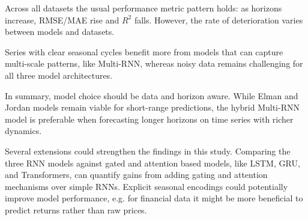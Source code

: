 \documentclass[conference]{IEEEtran}
\begin{document}
Across all datasets the usual performance metric pattern holds: as horizons increase, RMSE/MAE rise and $R^2$ falls. However, the rate of deterioration varies between models and datasets.

Series with clear seasonal cycles benefit more from models that can capture multi-scale patterns, like Multi-RNN, whereas noisy data remains challenging for all three model architectures.

In summary, model choice should be data and horizon aware. While Elman and Jordan models remain viable for short-range predictions, the hybrid Multi-RNN model is preferable when forecasting longer horizons on time series with richer dynamics.

Several extensions could strengthen the findings in this study. Comparing the three RNN models against gated and attention based models, like LSTM, GRU, and Transformers, can quantify gains from adding gating and attention mechanisms over simple RNNs. Explicit seasonal encodings could potentially improve model performance, e.g. for financial data it might be more beneficial to predict returns rather than raw prices. 



\vspace{12pt}
\end{document}
